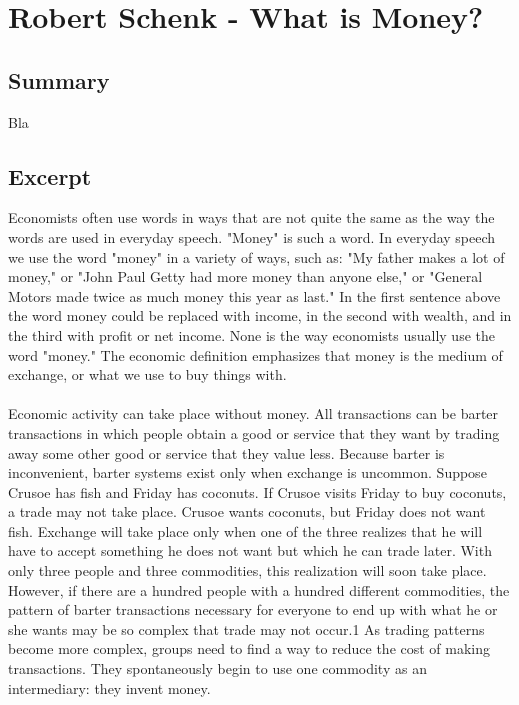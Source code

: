 \chapter{Robert Schenk - What is Money? \cite{articleschenk}}

\section{Summary}

Bla

\section{Excerpt}

Economists often use words in ways that are not quite the same as the way the words are used in everyday speech. "Money" is such a word. In everyday speech we use the word "money" in a variety of ways, such as: "My father makes a lot of money," or "John Paul Getty had more money than anyone else," or "General Motors made twice as much money this year as last." In the first sentence above the word money could be replaced with income, in the second with wealth, and in the third with profit or net income. None is the way economists usually use the word "money." The economic definition emphasizes that money is the medium of exchange, or what we use to buy things with. \\ \\
Economic activity can take place without money. All transactions can be barter transactions in which people obtain a good or service that they want by trading away some other good or service that they value less. Because barter is inconvenient, barter systems exist only when exchange is uncommon. Suppose Crusoe has fish and Friday has coconuts. If Crusoe visits Friday to buy coconuts, a trade may not take place. Crusoe wants coconuts, but Friday does not want fish. Exchange will take place only when one of the three realizes that he will have to accept something he does not want but which he can trade later. With only three people and three commodities, this realization will soon take place. However, if there are a hundred people with a hundred different commodities, the pattern of barter transactions necessary for everyone to end up with what he or she wants may be so complex that trade may not occur.1 As trading patterns become more complex, groups need to find a way to reduce the cost of making transactions. They spontaneously begin to use one commodity as an intermediary: they invent money. \\ \\
